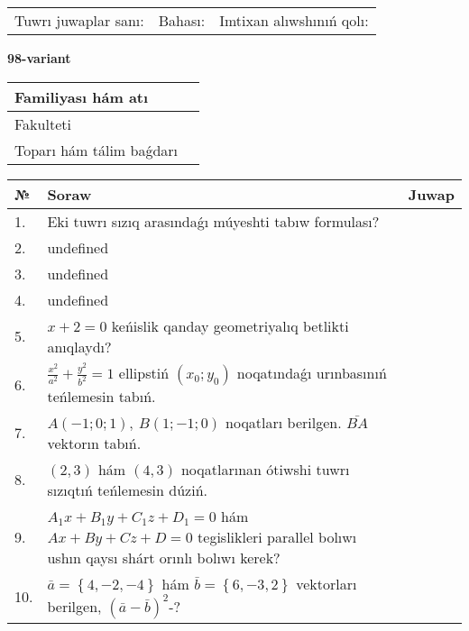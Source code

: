 \documentclass{article}
\begin{document}
\vspace{0.7cm}

\begin{tabular}{lll}
Tuwrı juwaplar sanı: \underline{\hspace{1cm}} & 
Bahası: \underline{\hspace{1cm}} & 
Imtixan alıwshınıń qolı: \underline{\hspace{2cm}} \\
\end{tabular}

\egroup

\newpage


\textbf{98-variant}\\

\bgroup
\def\arraystretch{1.6} %

\begin{tabular}{|m{5.7cm}|m{9.5cm}|}
\hline
Familiyası hám atı & \\
\hline
Fakulteti  & \\
\hline
Toparı hám tálim baǵdarı  & \\
\hline
\end{tabular}

\vspace{0.7cm}

\begin{tabular}{|m{0.7cm}|m{10cm}|m{4cm}|}
\hline
№ & Soraw & Juwap \\
\hline
1. & Eki tuwrı sızıq arasındaǵı múyeshti tabıw formulası? &  \\
\hline
2. & undefined &  \\
\hline
3. & undefined &  \\
\hline
4. & undefined &  \\
\hline
5. & \(x + 2 = 0\) keńislik qanday geometriyalıq betlikti anıqlaydı? &  \\
\hline
6. & \(\frac{x^{2}}{a^{2}} + \frac{y^{2}}{b^{2}} = 1\) ellipstiń \((x_{0};y_{0})\) noqatındaǵı urınbasınıń teńlemesin tabıń. &  \\
\hline
7. & \(A (- 1;0;1),\ B (1; - 1;0)\) noqatları berilgen. \(\bar{BA}\) vektorın tabıń. &  \\
\hline
8. & $(2, 3)$ hám $(4, 3)$ noqatlarınan ótiwshi tuwrı sızıqtıń teńlemesin dúziń. &  \\
\hline
9. & \(A_{1}x + B_{1}y + C_{1}z + D_{1} = 0\) hám \(Ax + By + Cz + D = 0\) tegislikleri parallel bolıwı ushın qaysı shárt orınlı bolıwı kerek? &  \\
\hline
10. & \(\bar{a} = \left\{ 4,- 2,- 4 \right\}\) hám \(\bar{b} = \left\{ 6,- 3, 2 \right\}\) vektorları berilgen, \((\bar{a} - \bar{b}) ^{2}\)-? & \\
\hline
\end{tabular}
\end{document}
